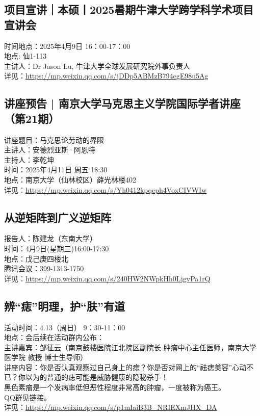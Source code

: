 \documentclass[letterpaper, 12pt]{article}
\begin{document}
\begin{multicols}{2}
\subsection{项目宣讲｜本硕丨2025暑期牛津大学跨学科学术项目宣讲会}
时间地点：2025年4月9日 16：00-17：00
\\地点: 仙1-113
\\主讲人：Dr Jason Lu, 牛津大学全球发展研究院外事负责人
\\详见：\url{https://mp.weixin.qq.com/s/jDDp5ABMzB794cgE98u5Ag}

\subsection{讲座预告 | 南京大学马克思主义学院国际学者讲座（第21期）}
讲座题目：马克思论劳动的界限
\\主讲人：安德烈亚斯·阿恩特
\\主持人：李乾坤
\\时间：2025年4月11日 周五 18:30
\\地点：南京大学（仙林校区）薛光林楼402
\\详见：\url{https://mp.weixin.qq.com/s/Yh0412kpqcph4VoxCIVWIw}

\subsection{从逆矩阵到广义逆矩阵}
报告人：陈建龙（东南大学）
\\时间：4月9日(星期三)16:00-17:30
\\地点：戊己庚四楼北
\\腾讯会议：399-1313-1750
\\详见：\url{https://mp.weixin.qq.com/s/240HW2NWpkHh0LjgvPa1rQ}
\subsection{辨“痣”明理，护“肤”有道}
活动时间：4.13（周日） 9：30-11：00
\\地点：会后续在活动群内公布：
\\主讲嘉宾：邹征云（南京鼓楼医院江北院区副院长 肿瘤中心主任医师，南京大学医学院 教授 博士生导师）
\\讲座内容：你是否认真观察过自己身上的痣？你是否对网上的“祛痣美容”心动不已？你以为的普通的痣可能是威胁健康的隐秘杀手！
\\黑色素瘤是一个发病率低但恶性程度非常高的肿瘤，一度被称为癌王。
\\QQ群见链接。
\\详见：\url{https://mp.weixin.qq.com/s/p1mIaiB3B_NRIEXmJHX_DA}

\end{multicols}
\end{document}
